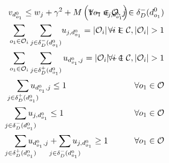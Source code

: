 \documentclass{article}
\begin{document}
\begin{alignat}{3}
    \label{mod:c10}        & v_{d^0_{o_1}}  \leq  w_j + \gamma^2 + M\left(1- u_{j,d^0_{o_1}}\right)                                                                                                                                                                                                                           & \hspace{-20mm}  \forall  o_1 \in \mathcal{O},  j \in \delta_{D}^{-}(d^0_{o_1})                   \\
    \label{mod:c11}        & \sum_{ \substack{o_1 \in \mathcal{O}_i }}{ \sum_{ j \in \delta^{-}_{D}(d^0_{o_1})}}{u_{j,d^0_{o_1} } } = |\mathcal{O}_i|-1                                                                                                                                                                       & \hspace{-20mm} \forall  i \in \mathcal{C},|\mathcal{O}_i| > 1                                    \\
    \label{mod:c12}        & \sum_{ \substack{o_1 \in \mathcal{O}_i }}\sum_{ j \in \delta^{+}_{D}(d^0_{o_1})}{u_{d^0_{o_1},j } } = |\mathcal{O}_i|-1                                                                                                                                                                          & \hspace{-40mm} \forall  i \in \mathcal{C}, |\mathcal{O}_i| > 1                                   \\
    \label{mod:c13}        & \hspace{3mm} \smashoperator{ \sum_{ j \in \delta^{+}_{D}(d^0_{o_1})}}{u_{d^0_{o_1},j } } \leq 1                                                                                                                                                                                                  & \hspace{-20mm}  \forall o_1 \in \mathcal{O}                                                      \\
    \label{mod:c14}        & \hspace{2mm} \smashoperator{ \sum_{ j \in \delta^{-}_{D}(d^0_{o_1})}}{u_{j,d^0_{o_1} } } \leq 1                                                                                                                                                                                                  & \hspace{-20mm} \forall o_1 \in \mathcal{O}                                                       \\
    \label{mod:c15}        & \hspace{2mm} \smashoperator{ \sum_{ j \in \delta^{+}_{D}(d^0_{o_1})}}{u_{d^0_{o_1},j } } +\smashoperator{ \sum_{ j \in \delta^{-}_{D}(d^0_{o_1})}}{u_{j,d^0_{o_1} } } \geq 1                                                                                                                     & \hspace{-20mm} \forall o_1 \in \mathcal{O}                                                       \\

\end{alignat}
\end{document}
